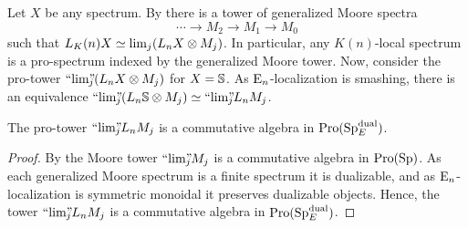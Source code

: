 Let $X$ be any spectrum. By \cite[7.10]{hovey-strickland_99} there is a tower of generalized Moore spectra 
\[\cdots \to M_2 \to M_1 \to M_0\]
such that $L_\Kn X \simeq \lim_j (L_n X \otimes M_j)$. In particular, any $K(n)$-local spectrum is a pro-spectrum indexed by the generalized Moore tower. Now, consider the pro-tower $\prolim (L_n X \otimes M_j)$ for $X=\S$. As $\En$-localization is smashing, there is an equivalence $\prolim (L_n \S \otimes M_j)\simeq \prolim L_n M_j$. 

\begin{lemma}
    \label{ch3:lm:Moore-tower-in-local-dualizable}
    The pro-tower $\prolim L_n M_j$ is a commutative algebra in $\Pro(\SpE\dual)$. 
\end{lemma}
\begin{proof}
    By \cite[6.3]{davis-lawson_2014} the Moore tower $\prolim M_j$ is a commutative algebra in $\Pro(\Sp)$. As each generalized Moore spectrum is a finite spectrum it is dualizable, and as $\En$-localization is symmetric monoidal it preserves dualizable objects. Hence, the tower $\prolim L_n M_j$ is a commutative algebra in $\Pro(\SpE\dual)$. 
\end{proof}

